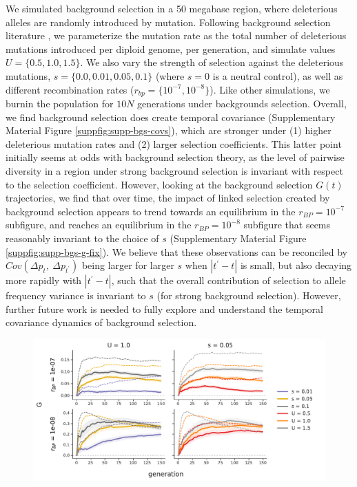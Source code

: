 \documentclass[11pt]{article}
\begin{document}
{We simulated background selection in a 50 megabase region, where deleterious
alleles are randomly introduced by mutation. Following background selection
literature
\parencite{Charlesworth1993-gb,Nordborg1996-nq,Hudson1994-oh,Hudson1995-xc}, we
parameterize the mutation rate as the total number of deleterious mutations
introduced per diploid genome, per generation, and simulate values $U = \{0.5,
1.0, 1.5\}$. We also vary the strength of selection against the deleterious
mutations, $s = \{0.0, 0.01, 0.05, 0.1\}$ (where $s=0$ is a neutral control),
as well as different recombination rates ($r_{bp} = \{10^{-7}, 10^{-8}\}$).
Like other simulations, we burnin the population for $10N$ generations under
backgrounds selection. Overall, we find background selection does create
temporal covariance (Supplementary Material Figure
\ref{suppfig:supp-bgs-covs}), which are stronger under (1) higher deleterious
mutation rates and (2) larger selection coefficients. This latter point
initially seems at odds with background selection theory, as the level of
pairwise diversity in a region under strong background selection is invariant
with respect to the selection coefficient. However, looking at the background
selection $G(t)$ trajectories, we find that over time, the impact of linked
selection created by background selection appears to trend towards an
equilibrium in the $r_{BP} = 10^{-7}$ subfigure, and reaches an equilibrium in
the $r_{BP} = 10^{-8}$ subfigure that seems reasonably invariant to the choice
of $s$ (Supplementary Material Figure \ref{suppfig:supp-bgs-g-fix}). We believe
that these observations can be reconciled by $Cov(\Delta p_t,~ \Delta
p_{t^{\prime}})$ being larger for larger $s$ when $|t^{\prime}-t|$ is small,
but also decaying more rapidly with $|t^{\prime}-t|$, such that the overall
contribution of selection to allele frequency variance is invariant to $s$ (for
strong background selection). However, further future work is needed to fully
explore and understand the temporal covariance dynamics of background
selection.

\begin{figure}[!ht]
  \centering
  \includegraphics[width=\textwidth]{figures/fig-bgs-G-with-fixations.pdf}


\end{figure}}
\end{document}
